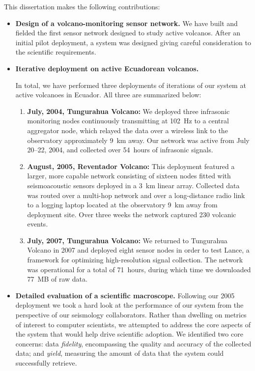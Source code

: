 This dissertation makes the following contributions:

\begin{itemize}

\item \textbf{Design of a volcano-monitoring sensor network.}
We have built and fielded the first sensor network designed to study active
volcanos. After an initial pilot deployment, a system was designed giving
careful consideration to the scientific requirements.

\item \textbf{Iterative deployment on active Ecuadorean volcanos.}

In total, we have performed three deployments of iterations of our system at
active volcanoes in Ecuador. All three are summarized below:

\begin{enumerate}

\item \textbf{July, 2004, Tungurahua Volcano:} We deployed three infrasonic
monitoring nodes continuously transmitting at 102~Hz to a central aggregator
node, which relayed the data over a wireless link to the observatory
approximately 9~km away.  Our network was active from July 20--22, 2004, and
collected over 54~hours of infrasonic signals.

\item \textbf{August, 2005, Reventador Volcano:} This deployment featured a larger,
more capable network consisting of sixteen nodes fitted with seismoacoustic
sensors deployed in a 3~km linear array.  Collected data was routed over a
multi-hop network and over a long-distance radio link to a logging laptop
located at the observatory 9~km away from deployment site.  Over three weeks
the network captured 230 volcanic events.

\item \textbf{July, 2007, Tungurahua Volcano:} We returned to Tungurahua Volcano in
2007 and deployed eight sensor nodes in order to test Lance, a framework for
optimizing high-resolution signal collection. The network was operational for
a total of 71~hours, during which time we downloaded 77~MB of raw data.

\end{enumerate}

\item \textbf{Detailed evaluation of a scientific macroscope.} Following our
2005 deployment we took a hard look at the performance of our system from the
perspective of our seismology collaborators. Rather than dwelling on metrics
of interest to computer scientists, we attempted to address the core aspects
of the system that would help drive scientific adoption. We identified two
core concerns: data \textit{fidelity}, encompassing the quality and accuracy
of the collected data; and \textit{yield}, measuring the amount of data that
the system could successfully retrieve.


\end{itemize}

